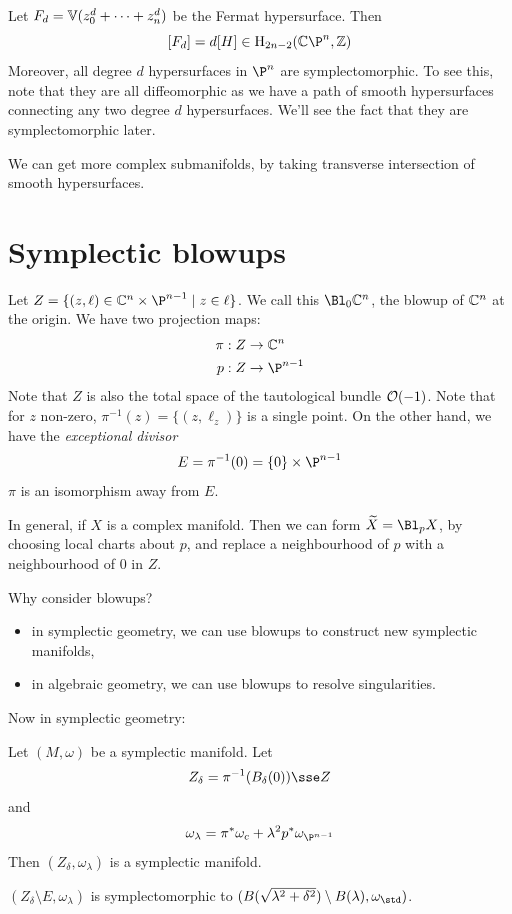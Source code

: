\documentclass{article}
\begin{document}
\lec

Let \(F_d = \mathbb{V}(z_0^d + \cdots + z_n^d)\) be the Fermat hypersurface. Then
\[[F_d] = d[H] \in \HH_{2n-2}(\C\P^n, \Z)\]
Moreover, all degree \(d\) hypersurfaces in \(\P^n\) are symplectomorphic. To see this, note that they are all diffeomorphic as we have a path of smooth hypersurfaces connecting any two degree \(d\) hypersurfaces. We'll see the fact that they are symplectomorphic later.

We can get more complex submanifolds, by taking transverse intersection of smooth hypersurfaces.

\section{Symplectic blowups}

Let \(Z = \{(z, \ell) \in \C^n \times \P^{n-1} \mid z\in \ell\}\). We call this \(\Bl_0\C^n\), the blowup of \(\mathbb{C}^n\) at the origin. We have two projection maps:
\begin{align*}
    \pi : Z &\to \C^n \\
    p : Z &\to \P^{n-1}
\end{align*}
Note that \(Z\) is also the total space of the tautological bundle \(\mathcal{O}(-1)\). Note that for \(z\) non-zero, \(\pi^{-1}(z) = \{(z, \ell_z)\}\) is a single point. On the other hand, we have the \emph{exceptional divisor}
\[E = \pi^{-1}(0) = \{0\} \times \P^{n-1}\]
\(\pi\) is an isomorphism away from \(E\).

In general, if \(X\) is a complex manifold. Then we can form \(\widetilde X = \Bl_pX\), by choosing local charts about \(p\), and replace a neighbourhood of \(p\) with a neighbourhood of \(0\) in \(Z\).

Why consider blowups?
\begin{itemize}
    \item in symplectic geometry, we can use blowups to construct new symplectic manifolds,
    \item in algebraic geometry, we can use blowups to resolve singularities.
\end{itemize}

Now in symplectic geometry:

Let \((M, \omega)\) be a symplectic manifold. Let
\[Z_\delta = \pi^{-1}(B_\delta(0)) \sse Z\]
and
\[\omega_\lambda = \pi^*\omega_c + \lambda^2p^*\omega_{\P^{n-1}}\]
Then \((Z_\delta, \omega_\lambda)\) is a symplectic manifold.

\begin{lemma}
    \label{lem:blowup-symplectomorphism}
    \((Z_\delta \setminus E, \omega_\lambda)\) is symplectomorphic to \((B(\sqrt{\lambda^2 + \delta^2}) \setminus B(\lambda), \omega_{\std})\).
\end{lemma}
\end{document}
